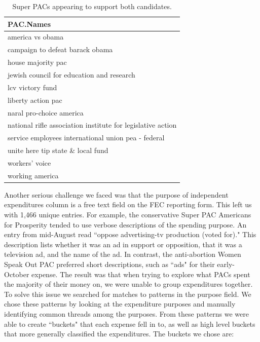\documentclass[11pt]{article}\usepackage{graphicx, color}
\begin{document}
\begin{table}[ht]
\begin{center}
\begin{tabular}{l}
  \hline
PAC.Names \\ 
  \hline
america vs obama \\ 
  campaign to defeat barack obama \\ 
  house majority pac \\ 
  jewish council for education and research \\ 
  lcv victory fund \\ 
  liberty action pac \\ 
  naral pro-choice america \\ 
  national rifle association institute for legislative action \\ 
  service employees international union pea - federal \\ 
  unite here tip state \& local fund \\ 
  workers' voice \\ 
  working america \\ 
   \hline
\end{tabular}
\caption{Super PACs appearing to support both candidates.}
\label{tab:prob_spe}
\end{center}
\end{table}



Another serious challenge we faced was that the purpose of independent expenditures column is a free text field on the FEC reporting form.  This left us with 1,466 unique entries. For example, the conservative Super PAC Americans for Prosperity tended to use verbose descriptions of the spending purpose. An entry from mid-August read ``oppose advertising-tv production (voted for)." This description lists whether it was an ad in support or opposition, that it was a television ad, and the name of the ad. In contrast, the anti-abortion Women Speak Out PAC preferred short descriptions, such as ``ads" for their early-October expense. The result was that when trying to explore what PACs spent the majority of their money on, we were unable to group expenditures together. To solve this issue we searched for matches to patterns in the purpose field. We chose these patterns by looking at the expenditure purposes and manually identifying common threads among the purposes. From these patterns we were able to create ``buckets" that each expense fell in to, as well as high level buckets that more generally classified the expenditures. The buckets we chose are: 
\end{document}
